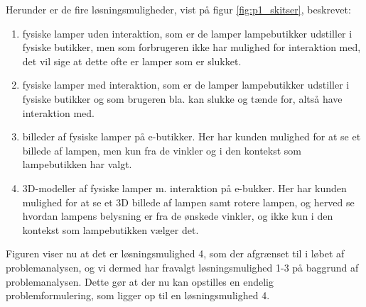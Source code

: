 Herunder er de fire løsningsmuligheder, vist på figur \ref{fig:p1_skitser}, beskrevet:
\begin{enumerate}
  \item fysiske lamper uden interaktion, som er de lamper lampebutikker udstiller i fysiske butikker, men som forbrugeren ikke har mulighed for interaktion med, det vil sige at dette ofte er lamper som er slukket.

  \item fysiske lamper med interaktion, som er de lamper lampebutikker udstiller i fysiske butikker og som brugeren bla. kan slukke og tænde for, altså have interaktion med.

  \item billeder af fysiske lamper på e-butikker. Her har kunden mulighed for at se et billede af lampen, men kun fra de vinkler og i den kontekst som lampebutikken har valgt.

  \item 3D-modeller af fysiske lamper m. interaktion på e-bukker. Her har kunden mulighed for at se et 3D billede af lampen samt rotere lampen, og herved se hvordan lampens belysning er fra de ønskede vinkler, og ikke kun i den kontekst som lampebutikken vælger det. 
\end{enumerate}

Figuren viser nu at det er løsningsmulighed 4, som der afgrænset til i løbet af problemanalysen, og vi dermed har fravalgt løsningsmulighed 1-3 på baggrund af problemanalysen. Dette gør at der nu kan opstilles en endelig problemformulering, som ligger op til en løsningsmulighed 4.